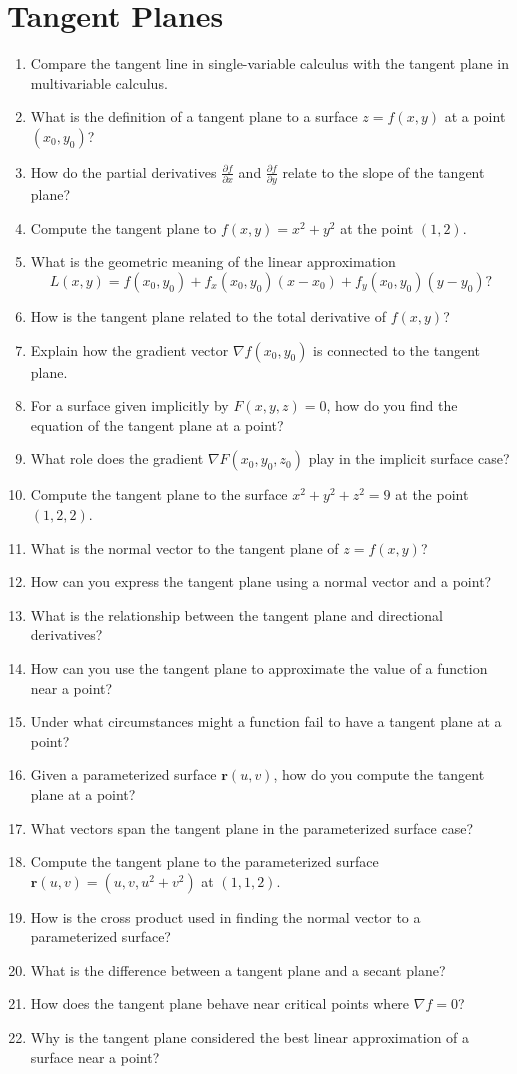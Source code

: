 \section{Tangent Planes}

\begin{enumerate}
  \item Compare the tangent line in single-variable calculus with the tangent plane in multivariable calculus.
  \item What is the definition of a tangent plane to a surface $z = f(x,y)$ at a point $(x_0, y_0)$?
  \item How do the partial derivatives $\frac{\partial f}{\partial x}$ and $\frac{\partial f}{\partial y}$ relate to the slope of the tangent plane?
  \item Compute the tangent plane to $f(x,y) = x^2 + y^2$ at the point $(1,2)$.
  \item What is the geometric meaning of the linear approximation
    \[
      L(x,y) = f(x_0,y_0) + f_x(x_0,y_0)(x - x_0) + f_y(x_0,y_0)(y - y_0)?
    \]
  \item How is the tangent plane related to the total derivative of $f(x,y)$?
  \item Explain how the gradient vector $\nabla f(x_0,y_0)$ is connected to the tangent plane.
  \item For a surface given implicitly by $F(x,y,z)=0$, how do you find the equation of the tangent plane at a point?
  \item What role does the gradient $\nabla F(x_0,y_0,z_0)$ play in the implicit surface case?
  \item Compute the tangent plane to the surface $x^2 + y^2 + z^2 = 9$ at the point $(1,2,2)$.
  \item What is the normal vector to the tangent plane of $z = f(x,y)$?
  \item How can you express the tangent plane using a normal vector and a point?
  \item What is the relationship between the tangent plane and directional derivatives?
  \item How can you use the tangent plane to approximate the value of a function near a point?
  \item Under what circumstances might a function fail to have a tangent plane at a point?
  \item Given a parameterized surface $\mathbf{r}(u,v)$, how do you compute the tangent plane at a point?
  \item What vectors span the tangent plane in the parameterized surface case?
  \item Compute the tangent plane to the parameterized surface $\mathbf{r}(u,v) = (u, v, u^2 + v^2)$ at $(1,1,2)$.
  \item How is the cross product used in finding the normal vector to a parameterized surface?
  \item What is the difference between a tangent plane and a secant plane?
  \item How does the tangent plane behave near critical points where $\nabla f = 0$?
  \item Why is the tangent plane considered the best linear approximation of a surface near a point?
\end{enumerate}
